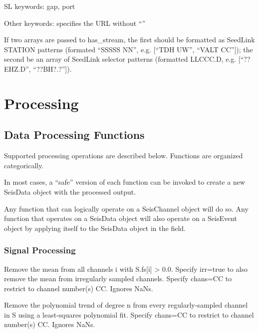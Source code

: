 \documentclass[letterpaper,11pt,english]{sphinxmanual}
\begin{document}
\begin{DUlineblock}{0em}
\item[] SL keywords: gap, port
\item[] Other keywords:  specifies the URL without “”
\end{DUlineblock}

If two arrays are passed to has\_stream, the first should be
formatted as SeedLink STATION patterns (formated “SSSSS NN”, e.g.
{[}“TDH UW”, “VALT CC”{]}); the second be an array of SeedLink selector
patterns (formatted LLCCC.D, e.g. {[}“??EHZ.D”, “??BH?.?”{]}).


\chapter{Processing}
\label{\detokenize{index:processing}}

\section{Data Processing Functions}
\label{\detokenize{src/Processing/processing:data-processing-functions}}\label{\detokenize{src/Processing/processing::doc}}
Supported processing operations are described below. Functions are organized
categorically.

In most cases, a “safe” version of each function can be invoked to create a
new SeisData object with the processed output.

Any function that can logically operate on a SeisChannel object will do so. Any
function that operates on a SeisData object will also operate on a SeisEvent
object by applying itself to the SeisData object in the  field.


\subsection{Signal Processing}
\label{\detokenize{src/Processing/processing:signal-processing}}
Remove the mean from all channels i with S.fs{[}i{]} \textgreater{} 0.0. Specify irr=true to also
remove the mean from irregularly sampled channels. Specify chans=CC to restrict
to channel number(s) CC. Ignores NaNs.

Remove the polynomial trend of degree n from every regularly-sampled channel
in S using a least-squares polynomial fit. Specify chans=CC to restrict
to channel number(s) CC. Ignores NaNs.
\end{document}
